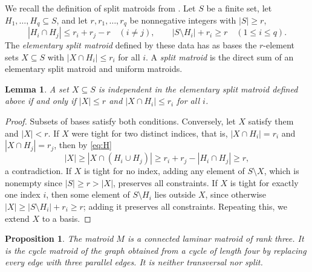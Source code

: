 \documentclass[11pt]{amsart}
\newtheorem{proposition}[theorem]{Proposition}
\newtheorem{lemma}[theorem]{Lemma}
\theoremstyle{definition}
\theoremstyle{remark}
\numberwithin{equation}{section}
\begin{document}
We recall the definition of split matroids from \cite[Section~2]{BJM}. Let $S$ be a finite set, let $H_1,\dots,H_q\subseteq S$, and let $r,r_1,\dots,r_q$ be nonnegative integers with $|S|\ge r$,
\begin{equation}\label{eq:H}
|H_i\cap H_j|\le r_i+r_j-r\quad(i\ne j),\qquad |S\setminus H_i|+r_i\ge r\quad(1\le i\le q).
\end{equation}
The \emph{elementary split matroid} defined by these data has as bases the $r$-element sets $X\subseteq S$ with $|X\cap H_i|\le r_i$ for all $i$. A \emph{split matroid} is the direct sum of an elementary split matroid and uniform matroids.

\begin{lemma}\label{lem:split}
A set $X\subseteq S$ is independent in the elementary split matroid defined above if and only if $|X|\le r$ and $|X\cap H_i|\le r_i$ for all $i$.
\end{lemma}

\begin{proof}
Subsets of bases satisfy both conditions. Conversely, let $X$ satisfy them and $|X|<r$. If $X$ were tight for two distinct indices, that is, $|X\cap H_i|=r_i$ and $|X\cap H_j|=r_j$, then by \eqref{eq:H}
\[
|X|\ge|X\cap(H_i\cup H_j)|\ge r_i+r_j-|H_i\cap H_j|\ge r,
\]
a contradiction. If $X$ is tight for no index, adding any element of $S\setminus X$, which is nonempty since $|S|\ge r>|X|$, preserves all constraints. If $X$ is tight for exactly one index $i$, then some element of $S\setminus H_i$ lies outside $X$, since otherwise $|X|\ge|S\setminus H_i|+r_i\ge r$; adding it preserves all constraints. Repeating this, we extend $X$ to a basis.
\end{proof}

\begin{proposition}\label{prop:example}
The matroid $M$ is a connected laminar matroid of rank three. It is the cycle matroid of the graph obtained from a cycle of length four by replacing every edge with three parallel edges. It is neither transversal nor split.
\end{proposition}
\end{document}

